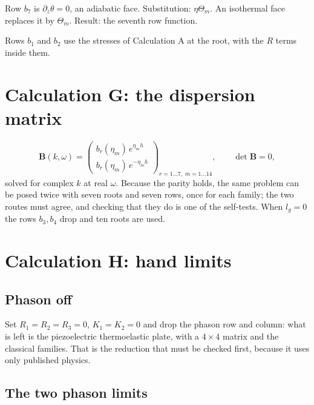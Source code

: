 \documentclass[11pt]{article}
\makeatletter
\newif\ifshowworked
\newenvironment{worked}{%
  \ifshowworked\par\smallskip\noindent\textit{Working.}\par\smallskip\else
  \setbox\z@\vbox\bgroup\fi}{\ifshowworked\par\smallskip\else\egroup\fi}
\makeatother
\begin{document}
\begin{worked}
Row $b_7$ is $\partial_z\theta=0$, an adiabatic face. Substitution: $\eta\Theta_m$. An isothermal face
replaces it by $\Theta_m$. Result: the seventh row function.
\end{worked}

Rows $b_1$ and $b_2$ use the stresses of Calculation A at the root, with the $R$ terms inside them.

\section{Calculation G: the dispersion matrix}\label{sec:calcG}

\begin{equation}
\mathbf B(k,\omega)=
\begin{pmatrix}
b_r(\eta_m)\,e^{\eta_mh}\\
b_r(\eta_m)\,e^{-\eta_mh}
\end{pmatrix}_{r=1\dots7,\;m=1\dots14},
\qquad \det\mathbf B=0 ,
\end{equation}
solved for complex $k$ at real $\omega$. Because the parity holds, the same problem can be posed twice with
seven roots and seven rows, once for each family; the two routes must agree, and checking that they do is
one of the self-tests. When $l_g=0$ the rows $b_3,b_4$ drop and ten roots are used.

\section{Calculation H: hand limits}\label{sec:calcH}

\subsection*{Phason off}

\begin{worked}
Set $R_1=R_2=R_3=0$, $K_1=K_2=0$ and drop the phason row and column: what is left is the piezoelectric
thermoelastic plate, with a $4\times4$ matrix and the classical families. That is the reduction that must be
checked first, because it uses only published physics.
\end{worked}

\subsection*{The two phason limits}
\end{document}
